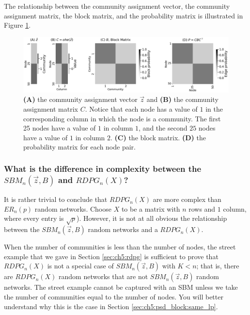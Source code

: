 The relationship between the community assignment vector, the community assignment matrix, the block matrix, and the probability matrix is illustrated in Figure \ref{fig:ch5:ier:sbm}.

\begin{figure}
    \centering
    \includegraphics[width=\linewidth]{representations/ch5/Images/sbm_prob.png}
    \caption[Deriving probability matrix for $SBM_n(\vec z, B)$ random network.]{\textbf{(A)} the community assignment vector $\vec z$ and \textbf{(B)} the community assignment matrix $C$. Notice that each node has a value of $1$ in the corresponding column in which the node is a community. The first 25 nodes have a value of $1$ in column $1$, and the second $25$ nodes have a value of $1$ in column $2$. \textbf{(C)} the block matrix. \textbf{(D)} the probability matrix for each node pair.}
    \label{fig:ch5:ier:sbm}
\end{figure}

\subsubsection{What is the difference in complexity between the $SBM_n(\vec z, B)$ and $RDPG_n(X)$?}
\label{sec:ch5:ier:rdpg_sbm}

It is rather trivial to conclude that $RDPG_n(X)$ are more complex than $ER_n(p)$ random networks. Choose $X$ to be a matrix with $n$ rows and $1$ column, where every entry is $\sqrt p$). However, it is not at all obvious the relationship between the $SBM_n(\vec z, B)$ random networks and a $RDPG_n(X)$. 

When the number of communities is less than the number of nodes, the street example that we gave in Section \ref{sec:ch5:rdpg} is sufficient to prove that $RDPG_n(X)$ is not a special case of $SBM_n(\vec z, B)$ with $K < n$; that is, there are $RDPG_n(X)$ random networks that are not $SBM_n(\vec z, B)$ random networks. The street example cannot be captured with an SBM unless we take the number of communities equal to the number of nodes. You will better understand why this is the case in Section \ref{sec:ch5:psd_block:same_lp}.

